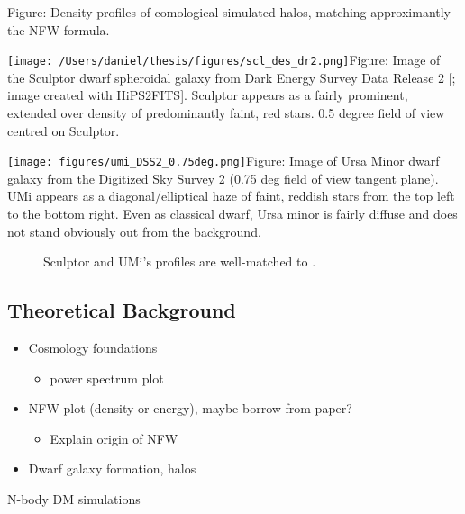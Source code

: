 Figure: Density profiles of comological simulated halos, matching
approximantly the NFW formula.

\texttt{[image: /Users/daniel/thesis/figures/scl\_des\_dr2.png]}Figure:
Image of the Sculptor dwarf spheroidal galaxy from Dark Energy Survey
Data Release 2 {[}\citet{abbott+2021}; image created with HiPS2FITS{]}.
Sculptor appears as a fairly prominent, extended over density of
predominantly faint, red stars. 0.5 degree field of view centred on
Sculptor.

\texttt{[image: figures/umi\_DSS2\_0.75deg.png]}Figure:
Image of Ursa Minor dwarf galaxy from the Digitized Sky Survey 2 (0.75
deg field of view tangent plane). UMi appears as a diagonal/elliptical
haze of faint, reddish stars from the top left to the bottom right. Even
as classical dwarf, Ursa minor is fairly diffuse and does not stand
obviously out from the background.

\begin{figure}
\centering
{}
\caption[Idealized simulations match Scl and UMi]{Sculptor and UMi's
profiles are well-matched to \citet{PNM2008}.}\label{fig:toy_profiles}
\end{figure}

\subsection{Theoretical Background}\label{theoretical-background}

\begin{itemize}
\tightlist
\item
  Cosmology foundations

  \begin{itemize}
  \tightlist
  \item
    power spectrum plot
  \end{itemize}
\item
  NFW plot (density or energy), maybe borrow from paper?

  \begin{itemize}
  \tightlist
  \item
    Explain origin of NFW
  \end{itemize}
\item
  Dwarf galaxy formation, halos
\end{itemize}

N-body DM simulations


